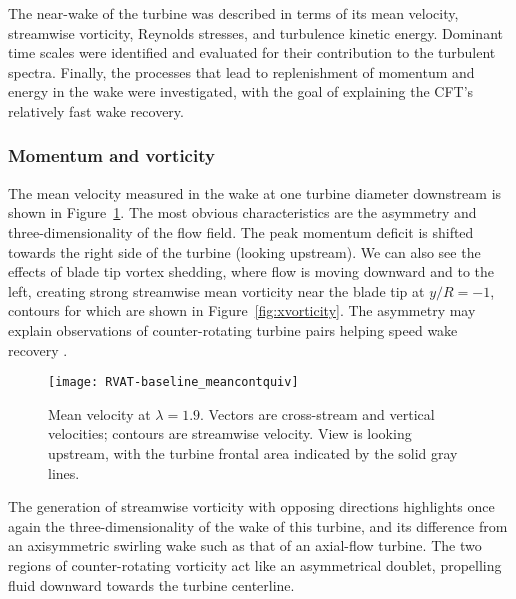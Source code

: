 The near-wake of the turbine was described in terms of its mean velocity,
streamwise vorticity, Reynolds stresses, and turbulence kinetic energy. Dominant
time scales were identified and evaluated for their contribution to the turbulent
spectra. Finally, the processes that lead to replenishment of momentum and
energy in the wake were investigated, with the goal of explaining the CFT's
relatively fast wake recovery.


\subsubsection{Momentum and vorticity}

The mean velocity measured in the wake at one turbine diameter downstream is
shown in Figure~\ref{fig:RVAT-baseline-meancontquiv}. The most obvious
characteristics are the asymmetry and three-dimensionality of the flow field.
The peak momentum deficit is shifted towards the right side of the turbine
(looking upstream). We can also see the effects of blade tip vortex shedding,
where flow is moving downward and to the left, creating strong streamwise mean
vorticity near the blade tip at $y/R=-1$, contours for which are shown in 
Figure~\ref{fig:xvorticity}. The asymmetry may explain observations of
counter-rotating turbine pairs helping speed wake recovery \cite{Dabiri2011}.

\begin{figure}
    \centering
    
    \texttt{[image: RVAT-baseline\_meancontquiv]}
    
    \caption{Mean velocity at $\lambda=1.9$. Vectors are cross-stream and
        vertical velocities; contours are streamwise velocity. View is looking
        upstream, with the turbine frontal area indicated by the solid gray lines.}
    
    \label{fig:RVAT-baseline-meancontquiv}
\end{figure}

The generation of streamwise vorticity with opposing directions highlights once
again the three-dimensionality of the wake of this turbine, and its difference
from an axisymmetric swirling wake such as that of an axial-flow turbine. The
two regions of counter-rotating vorticity act like an asymmetrical doublet,
propelling fluid downward towards the turbine centerline.

